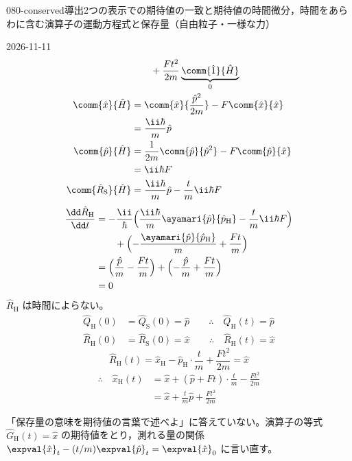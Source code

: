 \documentclass[uplatex,dvipdfmx,a4paper,11pt]{jsarticle}
\begin{document}
\begin{mondai}{080-conserved}{導出}{2つの表示での期待値の一致と期待値の時間微分，時間をあらわに含む演算子の運動方程式と保存量（自由粒子・一様な力）}
\begin{kotaeutsushi}{2026-11-11}
\begin{align*}
&\qquad+\frac{Ft^{2}}{2m}\underbrace{\comm{\hat{1}}{\hat{H}}}_{0}\\
\comm{\hat{x}}{\hat{H}}&=\comm{\hat{x}}{\frac{\hat{p}^{2}}{2m}}-F\comm{\hat{x}}{\hat{x}}\\
&=\frac{\ii\hbar}{m}\hat{p}\\
\comm{\hat{p}}{\hat{H}}&=\frac{1}{2m}\comm{\hat{p}}{\hat{p}^{2}}-F\comm{\hat{p}}{\hat{x}}\\
&=\ii\hbar F\\
\comm{\hat{R}_{\mathrm{S}}}{\hat{H}}&=\frac{\ii\hbar}{m}\hat{p}-\frac{t}{m}\ii\hbar F
\end{align*}
\begin{align*}
\frac{\dd\hat{R}_{\mathrm{H}}}{\dd t}&=-\frac{\ii}{\hbar}\Bigl(\frac{\ii\hbar}{m}\ayamari{\hat{p}}{\hat{p}_{\mathrm{H}}}-\frac{t}{m}\ii\hbar F\Bigr)\\
&\qquad+\Bigl(-\frac{\ayamari{\hat{p}}{\hat{p}_{\mathrm{H}}}}{m}+\frac{Ft}{m}\Bigr)\\
&=\Bigl(\frac{\hat{p}}{m}-\frac{Ft}{m}\Bigr)+\Bigl(-\frac{\hat{p}}{m}+\frac{Ft}{m}\Bigr)\\
&=0
\end{align*}
$\hat{R}_{\mathrm{H}}$ は時間によらない。
\begin{align*}
\hat{Q}_{\mathrm{H}}(0)&=\hat{Q}_{\mathrm{S}}(0)=\hat{p}\qquad\therefore\quad\hat{Q}_{\mathrm{H}}(t)=\hat{p}\\
\hat{R}_{\mathrm{H}}(0)&=\hat{R}_{\mathrm{S}}(0)=\hat{x}\qquad\therefore\quad\hat{R}_{\mathrm{H}}(t)=\hat{x}
\end{align*}
\[ \hat{R}_{\mathrm{H}}(t)=\hat{x}_{\mathrm{H}}-\hat{p}_{\mathrm{H}}\cdot\frac{t}{m}+\frac{Ft^{2}}{2m}=\hat{x} \]
\begin{align*}
\therefore\quad\hat{x}_{\mathrm{H}}(t)&=\hat{x}+(\hat{p}+Ft)\cdot\frac{t}{m}-\frac{Ft^{2}}{2m}\\
&=\hat{x}+\frac{t}{m}\hat{p}+\frac{Ft^{2}}{2m}
\end{align*}
\end{kotaeutsushi}
\begin{kizuki}
\item {} 「保存量の意味を期待値の言葉で述べよ」に答えていない。演算子の等式 $\hat{G}_{\mathrm{H}}(t)=\hat{x}$ の期待値をとり，測れる量の関係 $\expval{\hat{x}}_{t}-(t/m)\expval{\hat{p}}_{t}=\expval{\hat{x}}_{0}$ に言い直す。

\end{kizuki}
\end{mondai}
\end{document}
